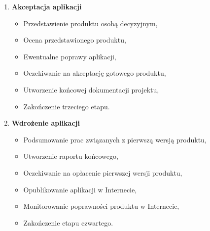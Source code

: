 \documentclass[12pt,a4paper]{article}
\begin{document}
\begin{enumerate}
\begin{itemize}
    \end{itemize}
    \item \textbf{Akceptacja aplikacji}
    \begin{itemize}
        \item Przedstawienie produktu osobą decyzyjnym,
        \item Ocena przedstawionego produktu, 
        \item Ewentualne poprawy aplikacji, 
        \item Oczekiwanie na akceptację gotowego produktu, 
        \item Utworzenie końcowej dokumentacji projektu, 
        \item Zakończenie trzeciego etapu.
    \end{itemize}
    \item \textbf{Wdrożenie aplikacji}
    \begin{itemize} 
        \item Podsumowanie prac związanych z pierwszą wersją produktu,
        \item Utworzenie raportu końcowego,
        \item Oczekiwanie na opłacenie pierwszej wersji produktu,
        \item Opublikowanie aplikacji w Internecie,
        \item Monitorowanie poprawności produktu w Internecie, 
        \item Zakończenie etapu czwartego.
    \end{itemize}
\end{enumerate}
\end{document}
